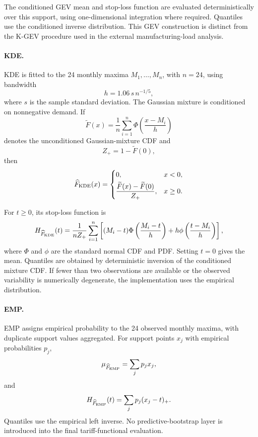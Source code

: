 \documentclass[AMA,Times1COL]{WileyNJDv5}
\begin{document}
The conditioned GEV mean and stop-loss function are evaluated
deterministically over this support, using one-dimensional integration
where required. Quantiles use the conditioned inverse distribution.
This GEV construction is distinct from the K-GEV procedure used in the
external manufacturing-load analysis.


\paragraph*{KDE.}

KDE is fitted to the 24 monthly maxima
\(M_1,\ldots,M_n\), with \(n=24\), using bandwidth
\[
h
=
1.06\,s\,n^{-1/5},
\]
where \(s\) is the sample standard deviation. The Gaussian mixture is
conditioned on nonnegative demand. If
\[
\widetilde F(x)
=
\frac{1}{n}
\sum_{i=1}^{n}
\Phi\left(\frac{x-M_i}{h}\right)
\]
denotes the unconditioned Gaussian-mixture CDF and
\[
Z_+
=
1-\widetilde F(0),
\]
then
\[
\widehat F_{\rm KDE}(x)
=
\begin{cases}
0,
&
x<0,
\\[3pt]
\dfrac{\widetilde F(x)-\widetilde F(0)}{Z_+},
&
x\geq0.
\end{cases}
\]

For \(t\geq0\), its stop-loss function is
\[
H_{\widehat F_{\rm KDE}}(t)
=
\frac{1}{nZ_+}
\sum_{i=1}^{n}
\left[
(M_i-t)
\Phi\left(\frac{M_i-t}{h}\right)
+
h\phi\left(\frac{t-M_i}{h}\right)
\right],
\]
where \(\Phi\) and \(\phi\) are the standard normal CDF and PDF.
Setting \(t=0\) gives the mean. Quantiles are obtained by deterministic
inversion of the conditioned mixture CDF. If fewer than two
observations are available or the observed variability is numerically
degenerate, the implementation uses the empirical distribution.


\paragraph*{EMP.}

EMP assigns empirical probability to the 24 observed monthly maxima,
with duplicate support values aggregated. For support points \(x_j\)
with empirical probabilities \(p_j\),
\[
\mu_{\widehat F_{\rm EMP}}
=
\sum_jp_jx_j,
\]
and
\[
H_{\widehat F_{\rm EMP}}(t)
=
\sum_jp_j(x_j-t)_+.
\]
Quantiles use the empirical left inverse. No predictive-bootstrap layer
is introduced into the final tariff-functional evaluation.


\end{document}

